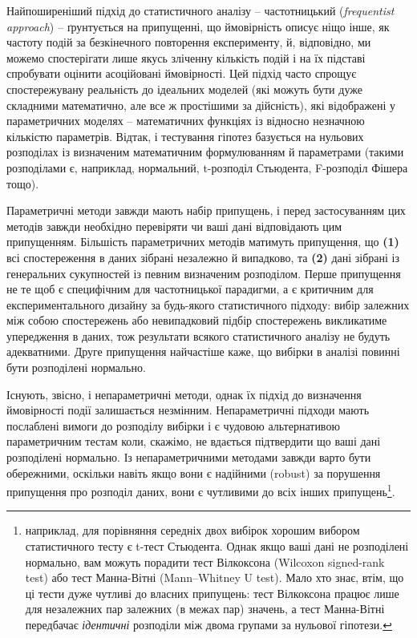 \documentclass[
  11pt,
]{book}
\begin{document}
Найпоширеніший підхід до статистичного аналізу -- частотницький (\emph{frequentist approach}) -- ґрунтується на припущенні, що ймовірність описує ніщо інше, як частоту подій за безкінечного повторення експерименту, й, відповідно, ми можемо спостерігати лише якусь зліченну кількість подій і на їх підставі спробувати оцінити асоційовані ймовірності. Цей підхід часто спрощує спостережувану реальність до ідеальних моделей (які можуть бути дуже складними математично, але все ж простішими за дійсність), які відображені у параметричних моделях -- математичних функціях із відносно незначною кількістю параметрів. Відтак, і тестування гіпотез базується на нульових розподілах із визначеним математичним формулюванням й параметрами (такими розподілами є, наприклад, нормальний, t-розподіл Стьюдента, F-розподіл Фішера тощо).

Параметричні методи завжди мають набір припущень, і перед застосуванням цих методів завжди необхідно перевіряти чи ваші дані відповідають цим припущенням. Більшість параметричних методів матимуть припущення, що \textbf{(1)} всі спостереження в даних зібрані незалежно й випадково, та \textbf{(2)} дані зібрані із генеральних сукупностей із певним визначеним розподілом. Перше припущення не те щоб є специфічним для частотницької парадигми, а є критичним для експериментального дизайну за будь-якого статистичного підходу: вибір залежних між собою спостережень або невипадковий підбір спостережень викликатиме упередження в даних, тож результати всякого статистичного аналізу не будуть адекватними. Друге припущення найчастіше каже, що вибірки в аналізі повинні бути розподілені нормально.

Існують, звісно, і непараметричні методи, однак їх підхід до визначення ймовірності події залишається незмінним. Непараметричні підходи мають послаблені вимоги до розподілу вибірки і є чудовою альтернативою параметричним тестам коли, скажімо, не вдається підтвердити що ваші дані розподілені нормально. Із непараметричними методами завжди варто бути обережними, оскільки навіть якщо вони є надійними (robust) за порушення припущення про розподіл даних, вони є чутливими до всіх інших припущень\footnote{наприклад, для порівняння середніх двох вибірок хорошим вибором статистичного тесту є t-тест Стьюдента. Однак якщо ваші дані не розподілені нормально, вам можуть порадити тест Вілкоксона (Wilcoxon signed-rank test) або тест Манна-Вітні (Mann--Whitney U test). Мало хто знає, втім, що ці тести дуже чутливі до власних припущень: тест Вілкоксона працює лише для незалежних пар залежних (в межах пар) значень, а тест Манна-Вітні передбачає \emph{ідентичні} розподіли між двома групами за нульової гіпотези.}.
\end{document}
